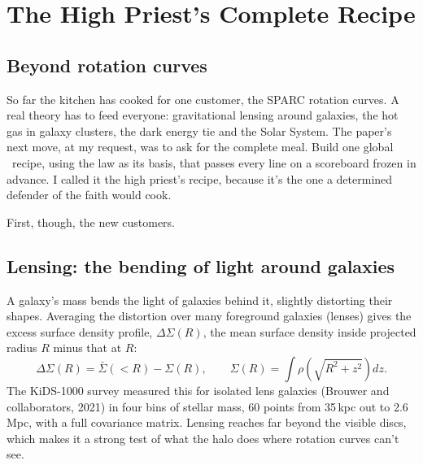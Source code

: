 \chapter{The High Priest's Complete Recipe}




\section{Beyond rotation curves}

So far the kitchen has cooked for one customer, the SPARC rotation curves. A real theory has to feed everyone: gravitational lensing around galaxies, the hot gas in galaxy clusters, the dark energy tie and the Solar System. The paper's next move, at my request, was to ask for the complete meal. Build one global \LCDM\ recipe, using the law as its basis, that passes every line on a scoreboard frozen in advance. I called it the high priest's recipe, because it's the one a determined defender of the faith would cook.

First, though, the new customers.

\section{Lensing: the bending of light around galaxies}

A galaxy's mass bends the light of galaxies behind it, slightly distorting their shapes. Averaging the distortion over many foreground galaxies (lenses) gives the excess surface density profile, $\Delta\Sigma(R)$, the mean surface density inside projected radius $R$ minus that at $R$:
\begin{equation}
\Delta\Sigma(R)=\bar\Sigma(<R)-\Sigma(R),\qquad\Sigma(R)=\int\rho\!\left(\sqrt{R^2+z^2}\right)dz.
\end{equation}
The KiDS-1000 survey measured this for isolated lens galaxies (Brouwer and collaborators, 2021) in four bins of stellar mass, 60 points from 35\,kpc out to 2.6\,Mpc, with a full covariance matrix. Lensing reaches far beyond the visible discs, which makes it a strong test of what the halo does where rotation curves can't see.

